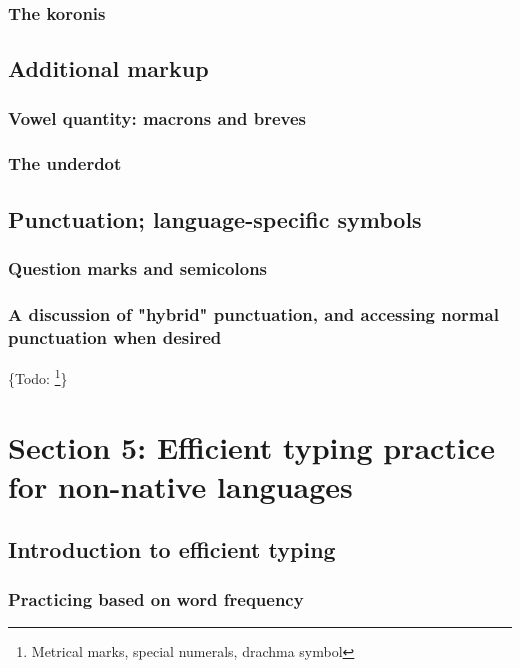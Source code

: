 \documentclass[11pt]{article}
\begin{document}
\subsubsection{The koronis}
\label{sec:orgbadb934}

\subsection{Additional markup}
\label{sec:orgcf2cd73}

\subsubsection{Vowel quantity: macrons and breves}
\label{sec:orgc0782b8}

\subsubsection{The underdot}
\label{sec:orgdceba13}

\subsection{Punctuation; language-specific symbols}
\label{sec:org4a93f89}

\subsubsection{Question marks and semicolons}
\label{sec:org6dbeb2f}

\subsubsection{A discussion of "hybrid" punctuation, and accessing normal punctuation when desired}
\label{sec:orgc31535c}

\{Todo: \footnote{Metrical marks, special numerals, drachma symbol}\}

\section{Section 5: Efficient typing practice for non-native languages}
\label{sec:org794dba7}

\subsection{Introduction to efficient typing}
\label{sec:org7584e51}

\subsubsection{Practicing based on word frequency}
\label{sec:orgc48b633}
\end{document}
